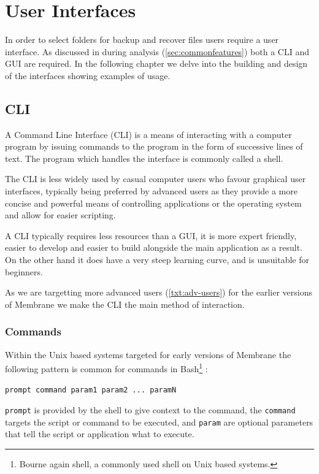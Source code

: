 \documentclass[11pt, a4paper, twoside]{report}
\def\code#1{\texttt{#1}}
\begin{document}
\chapter{User Interfaces}

In order to select folders for backup and recover files users require a user interface. As discussed in during analysis (\ref{sec:commonfeatures}) both a CLI and GUI are required. In the following chapter we delve into the building and design of the interfaces showing examples of usage.

\section{CLI}

A Command Line Interface (CLI) is a means of interacting with a computer program by issuing commands to the program in the form of successive lines of text. The program which handles the interface is commonly called a shell.

The CLI is less widely used by casual computer users who favour graphical user interfaces, typically being preferred by advanced users as they provide a more concise and powerful means of controlling applications or the operating system and allow for easier scripting.

A CLI typically requires less resources than a GUI, it is more expert friendly, easier to develop and easier to build alongside the main application as a result. On the other hand it does have a very steep learning curve, and is unsuitable for beginners.

As we are targetting more advanced users (\ref{txt:adv-users}) for the earlier versions of Membrane we make the CLI the main method of interaction.

\subsection{Commands}

Within the Unix based systems targeted for early versions of Membrane the following pattern is common for commands in Bash\footnote{Bourne again shell, a commonly used shell on Unix based systems.} \citep{gnu2016man}:

\begin{displayquote}
 \code{prompt command param1 param2 ... paramN}
\end{displayquote}

\code{prompt} is provided by the shell to give context to the command, the \code{command} targets the script or command to be executed, and \code{param} are optional parameters that tell the script or application what to execute.
\end{document}
